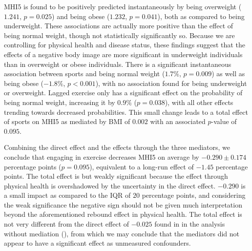 MHI5 is found to be positively predicted instantaneously by being overweight ($1.241$, $p = 0.025$) and
being obese ($1.232$, $p = 0.041$), both as compared to being underweight. These associations are actually more positive
than the effect of being normal weight, though not statistically significantly so.
Because we are controlling for physical health and disease status, these findings suggest that the effects of a negative
body image are more significant in underweight individuals than in overweight or obese individuals.
There is a significant instantaneous association between sports and being normal weight ($1.7\%$, $p = 0.009$)
as well as being obese ($-1.8\%$, $p < 0.001$), with no association found for being underweight or overweight.
Lagged exercise only has a significant effect on the probability of being normal weight, increasing it by $0.9\%$ ($p = 0.038$),
with all other effects trending towards decreased probabilities.
This small change leads to a total effect of sports on MHI5 as mediated by BMI of $0.002$ with an associated $p$-value of $0.095$.

Combining the direct effect and the effects through the three mediators, we conclude that engaging in exercise decreases
MHI5 on average by $-0.290 \pm 0.174$ percentage points ($p = 0.095$), equivalent to a long-run effect of $-1.45$
percentage points.
The total effect is but weakly significant because the effect through physical health is overshadowed by the uncertainty
in the direct effect.
$-0.290$ is a small impact as compared to the IQR of $20$ percentage points, and considering the weak significance
the negative sign should not be given much interpretation beyond the aforementioned rebound effect in physical health.
The total effect is not very different from the direct effect of $-0.025$ found in in the analysis without mediation
(), from which we may conclude that the mediators did not appear to have a significant
effect as unmeasured confounders.


